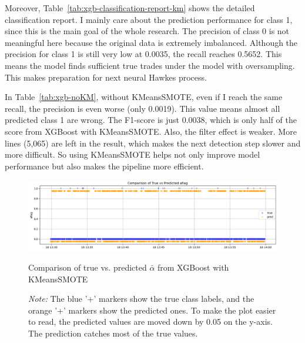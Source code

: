 Moreover, Table~\ref{tab:xgb-classification-report-km} shows the detailed classification report. I mainly care about the prediction performance for class 1, since this is the main goal of the whole research. The precision of class 0 is not meaningful here because the original data is extremely imbalanced. Although the precision for class 1 is still very low at 0.0035, the recall reaches 0.5652. This means the model finds sufficient true trades under the model with oversampling. This makes preparation for next neural Hawkes process.

In Table~\ref{tab:xgb-noKM}, without KMeansSMOTE, even if I reach the same recall, the precision is even worse (only 0.0019). This value means almost all predicted class 1 are wrong. The F1-score is just 0.0038, which is only half of the score from XGBoost with KMeansSMOTE. Also, the filter effect is weaker. More lines (5,065) are left in the result, which makes the next detection step slower and more difficult. So using KMeansSMOTE helps not only improve model performance but also makes the pipeline more efficient.

\begin{figure}[H]
    \centering
    \includegraphics[width=\textwidth]{figures/aflag_XGBoost_181330.png}
    \caption{Comparison of true vs. predicted $\bar{\alpha}$ from XGBoost with KMeansSMOTE} 
    \caption*{\textit{Note:} The blue '+' markers show the true class labels, and the orange '+' markers show the predicted ones. To make the plot easier to read, the predicted values are moved down by 0.05 on the y-axis.  The prediction catches most of the true values.
    }
    \label{fig:xgb-pred-vs-true-km}
\end{figure}

